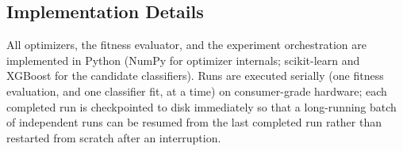 \subsection{Implementation Details}
\label{sec:3.10}

All optimizers, the fitness evaluator, and the experiment orchestration
are implemented in Python (NumPy for optimizer internals; scikit-learn
\cite{Pedregosa:2011} and XGBoost \cite{Chen:2016} for the candidate
classifiers). Runs are executed serially
(one fitness evaluation, and one classifier fit, at a time) on
consumer-grade hardware; each completed run is checkpointed to disk
immediately so that a long-running batch of independent runs can be
resumed from the last completed run rather than restarted from scratch
after an interruption.
